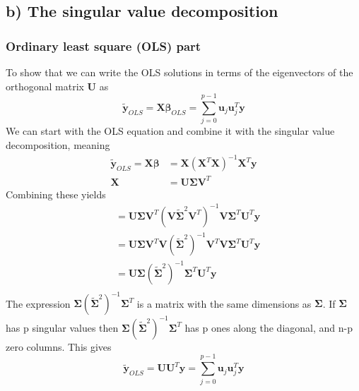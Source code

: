 \documentclass{article}
\begin{document}
\subsection*{b) The singular value decomposition}
\subsubsection*{Ordinary least square (OLS) part}
To show that we can write the OLS solutions in terms of the eigenvectors of the orthogonal matrix $\mathbf{U}$ as
$$\bm{\tilde{y}}_{OLS} = \mathbf{X}\bm{\beta}_{OLS} = \sum_{j=0}^{p-1}\bm{u}_{j}\bm{u}_{j}^{T}\bm{y}$$
We can start with the OLS equation and combine it with the singular value decomposition, meaning
\begin{align*}
    \bm{\tilde{y}}_{OLS} = \mathbf{X}\bm{\beta} &= \mathbf{X}(\mathbf{X}^{T}\mathbf{X})^{-1}\mathbf{X}^{T}\bm{y} \\
    \mathbf{X} &= \mathbf{U}\bm{\Sigma}\mathbf{V}^{T}
\end{align*}
Combining these yields
\begin{align*}
    &= \mathbf{U}\bm{\Sigma}\mathbf{V}^{T}(\mathbf{V}\bm{\tilde{{\Sigma}}}^{2}\mathbf{V}^{T})^{-1}\mathbf{V}\mathbf{\Sigma}^{T}\mathbf{U}^{T}\bm{y} \\
    &= \mathbf{U}\bm{\Sigma}\mathbf{V}^{T}\mathbf{V}(\bm{\tilde{{\Sigma}}}^{2})^{-1}\mathbf{V}^{T}\mathbf{V}\mathbf{\Sigma}^{T}\mathbf{U}^{T}\bm{y} \\ 
    &= \mathbf{U}\bm{\Sigma}(\bm{\tilde{{\Sigma}}}^{2})^{-1}\mathbf{\Sigma}^{T}\mathbf{U}^{T}\bm{y} \\
\end{align*}
The expression $\bm{\Sigma}(\bm{\tilde{{\Sigma}}}^{2})^{-1}\mathbf{\Sigma}^{T}$ is a matrix with the same dimensions as $\bm{\Sigma}$.
If $\bm{\Sigma}$ has p singular values then $\bm{\Sigma}(\bm{\tilde{{\Sigma}}}^{2})^{-1}\mathbf{\Sigma}^{T}$ has p ones along the
diagonal, and n-p zero columns.  
This gives 
$$\bm{\tilde{y}}_{OLS} = \mathbf{U}\mathbf{U}^{T}\bm{y} = \sum_{j=0}^{p-1}\bm{u}_{j}\bm{u}_{j}^{T}\bm{y}$$
\end{document}
